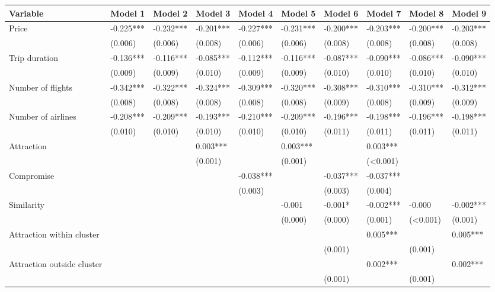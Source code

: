 \documentclass[a4paper,12pt]{article}
\begin{document}
\clearpage
\newpage
\clearpage
\begin{table}
    \centering
    \scriptsize
    \begin{tabular}{p{5.3cm}*{9}{p{1.3cm}}}
    \toprule
    Variable & Model 1 & Model 2 & Model 3 & Model 4 & Model 5 & Model 6 & Model 7 & Model 8 & Model 9 \\
    \midrule   
    Price & -0.225*** & -0.232*** & -0.201*** & -0.227*** & -0.231*** & -0.200*** & -0.203*** & -0.200*** & -0.203*** \\
     & (0.006) & (0.006) & (0.008) & (0.006) & (0.006) & (0.008) & (0.008) & (0.008) & (0.008) \\
    Trip duration & -0.136*** & -0.116*** & -0.085*** & -0.112*** & -0.116*** & -0.087*** & -0.090*** & -0.086*** & -0.090*** \\
     & (0.009) & (0.009) & (0.010) & (0.009) & (0.009) & (0.010) & (0.010) & (0.010) & (0.010) \\
    Number of flights & -0.342*** & -0.322*** & -0.324*** & -0.309*** & -0.320*** & -0.308*** & -0.310*** & -0.310*** & -0.312*** \\
     & (0.008) & (0.008) & (0.008) & (0.008) & (0.008) & (0.009) & (0.008) & (0.009) & (0.009) \\
    Number of airlines & -0.208*** & -0.209*** & -0.193*** & -0.210*** & -0.209*** & -0.196*** & -0.198*** & -0.196*** & -0.198*** \\
     & (0.010) & (0.010) & (0.010) & (0.010) & (0.010) & (0.011) & (0.011) & (0.011) & (0.011) \\
    Attraction & & & 0.003*** & & 0.003*** & & 0.003*** & & \\
     & & & (0.001) & & (0.001) & & (<0.001) & & \\
    Compromise & & & & -0.038*** & & -0.037*** & -0.037*** & & \\
     & & & & (0.003) & & (0.003) & (0.004) & & \\
    Similarity & & & & & -0.001 & -0.001* & -0.002*** & -0.000 & -0.002*** \\
     & & & & & (0.000) & (0.000) & (0.001) & (<0.001) & (0.001) \\
    Attraction within cluster & & & & & & & 0.005*** & & 0.005*** \\
     & & & & & & (0.001) & & (0.001) & \\
    Attraction outside cluster & & & & & & & 0.002*** & & 0.002*** \\
     & & & & & & (0.001) & & (0.001) & \\

\end{tabular}
\end{table}
\end{document}
